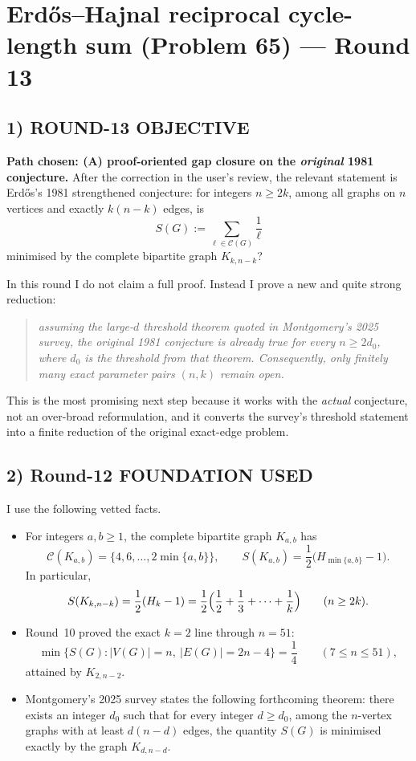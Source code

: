 \section{Erd\H{o}s--Hajnal reciprocal cycle-length sum (Problem 65) --- Round 13}

\subsection*{1) ROUND-13 OBJECTIVE}

\textbf{Path chosen: (A) proof-oriented gap closure on the \emph{original} 1981 conjecture.}
After the correction in the user's review, the relevant statement is Erd\H{o}s's 1981 strengthened conjecture:
for integers $n\ge 2k$, among all graphs on $n$ vertices and exactly $k(n-k)$ edges, is
\[
S(G):=\sum_{\ell\in \mathcal C(G)}\frac1\ell
\]
minimised by the complete bipartite graph $K_{k,n-k}$?

In this round I do not claim a full proof. Instead I prove a new and quite strong reduction:
\begin{quote}
\emph{assuming the large-$d$ threshold theorem quoted in Montgomery's 2025 survey, the original 1981 conjecture is already true for every $n\ge 2d_0$, where $d_0$ is the threshold from that theorem. Consequently, only finitely many exact parameter pairs $(n,k)$ remain open.}
\end{quote}

This is the most promising next step because it works with the \emph{actual} conjecture, not an over-broad reformulation, and it converts the survey's threshold statement into a finite reduction of the original exact-edge problem.

\subsection*{2) Round-12 FOUNDATION USED}

I use the following vetted facts.
\begin{itemize}
\item[(F1)] For integers $a,b\ge 1$, the complete bipartite graph $K_{a,b}$ has
\[
\mathcal C(K_{a,b})=\{4,6,\dots,2\min\{a,b\}\},
\qquad
S(K_{a,b})=\frac12\bigl(H_{\min\{a,b\}}-1\bigr).
\]
In particular,
\[
S(K_{k,n-k})=\frac12(H_k-1)=\frac12\Bigl(\frac12+\frac13+\cdots+\frac1k\Bigr)
\qquad (n\ge 2k).
\]

\item[(F2)] Round~10 proved the exact $k=2$ line through $n=51$:
\[
\min\{S(G): |V(G)|=n,\ |E(G)|=2n-4\}=\frac14
\qquad (7\le n\le 51),
\]
attained by $K_{2,n-2}$.

\item[(F3)] Montgomery's 2025 survey states the following forthcoming theorem: there exists an integer $d_0$ such that for every integer $d\ge d_0$, among the $n$-vertex graphs with at least $d(n-d)$ edges, the quantity $S(G)$ is minimised exactly by the graph $K_{d,n-d}$.
\end{itemize}

